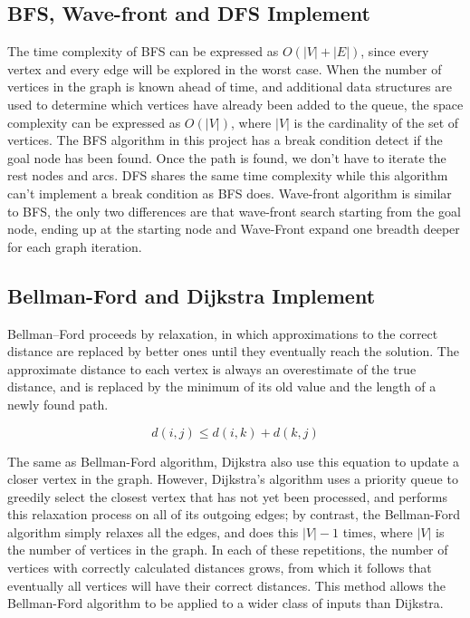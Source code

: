 \documentclass[11pt, onecolumn, letterpaper]{article}
\begin{document}
\subsection{BFS, Wave-front and DFS Implement}
The time complexity of BFS can be expressed as $O(|V|+|E|)$, since every vertex and every edge will be explored in the worst case. When the number of vertices in the graph is known ahead of time, and additional data structures are used to determine which vertices have already been added to the queue, the space complexity can be expressed as $O(|V|)$, where $|V|$ is the cardinality of the set of vertices. The BFS algorithm in this project has a break condition detect if the goal node has been found. Once the path is found, we don't have to iterate the rest nodes and arcs. DFS shares the same time complexity while this algorithm can't implement a break condition as BFS does. Wave-front algorithm is similar to BFS, the only two differences are that wave-front search starting from the goal node, ending up at the starting node and Wave-Front expand one breadth deeper for each graph iteration.

\subsection{Bellman-Ford and Dijkstra Implement}
Bellman–Ford proceeds by relaxation, in which approximations to the correct distance are replaced by better ones until they eventually reach the solution. The approximate distance to each vertex is always an overestimate of the true distance, and is replaced by the minimum of its old value and the length of a newly found path.

$$d(i,j) \leq d(i,k) + d(k,j)$$

The same as Bellman-Ford algorithm, Dijkstra also use this equation to update a closer vertex in the graph. However, Dijkstra's algorithm uses a priority queue to greedily select the closest vertex that has not yet been processed, and performs this relaxation process on all of its outgoing edges; by contrast, the Bellman-Ford algorithm simply relaxes all the edges, and does this $|V|-1$ times, where $|V|$ is the number of vertices in the graph. In each of these repetitions, the number of vertices with correctly calculated distances grows, from which it follows that eventually all vertices will have their correct distances. This method allows the Bellman-Ford algorithm to be applied to a wider class of inputs than Dijkstra.
\end{document}
